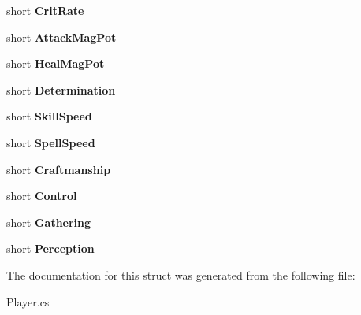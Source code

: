 \begin{DoxyCompactItemize}
\item 
\hypertarget{structffxivlib_1_1_player_1_1_p_l_a_y_e_r_i_n_f_o_ab40c6badf25d237553667c6e8cd2204b}{short {\bfseries Crit\-Rate}}\label{structffxivlib_1_1_player_1_1_p_l_a_y_e_r_i_n_f_o_ab40c6badf25d237553667c6e8cd2204b}

\item 
\hypertarget{structffxivlib_1_1_player_1_1_p_l_a_y_e_r_i_n_f_o_a82a84c20248f3b4697cdc0efbe115aaf}{short {\bfseries Attack\-Mag\-Pot}}\label{structffxivlib_1_1_player_1_1_p_l_a_y_e_r_i_n_f_o_a82a84c20248f3b4697cdc0efbe115aaf}

\item 
\hypertarget{structffxivlib_1_1_player_1_1_p_l_a_y_e_r_i_n_f_o_aa3672b08ab0dcf943814b39adc3684de}{short {\bfseries Heal\-Mag\-Pot}}\label{structffxivlib_1_1_player_1_1_p_l_a_y_e_r_i_n_f_o_aa3672b08ab0dcf943814b39adc3684de}

\item 
\hypertarget{structffxivlib_1_1_player_1_1_p_l_a_y_e_r_i_n_f_o_a808248c6e0a41b393bdc2aae1874ea8e}{short {\bfseries Determination}}\label{structffxivlib_1_1_player_1_1_p_l_a_y_e_r_i_n_f_o_a808248c6e0a41b393bdc2aae1874ea8e}

\item 
\hypertarget{structffxivlib_1_1_player_1_1_p_l_a_y_e_r_i_n_f_o_ab311411afe59aa5562b5f122fe97ca78}{short {\bfseries Skill\-Speed}}\label{structffxivlib_1_1_player_1_1_p_l_a_y_e_r_i_n_f_o_ab311411afe59aa5562b5f122fe97ca78}

\item 
\hypertarget{structffxivlib_1_1_player_1_1_p_l_a_y_e_r_i_n_f_o_acfca12f84244ffa407a78af2914b63fc}{short {\bfseries Spell\-Speed}}\label{structffxivlib_1_1_player_1_1_p_l_a_y_e_r_i_n_f_o_acfca12f84244ffa407a78af2914b63fc}

\item 
\hypertarget{structffxivlib_1_1_player_1_1_p_l_a_y_e_r_i_n_f_o_a132cc5dcd38950cf69ba96092c9ff817}{short {\bfseries Craftmanship}}\label{structffxivlib_1_1_player_1_1_p_l_a_y_e_r_i_n_f_o_a132cc5dcd38950cf69ba96092c9ff817}

\item 
\hypertarget{structffxivlib_1_1_player_1_1_p_l_a_y_e_r_i_n_f_o_adda7db7f5b2a2b74875cb56243d16cf2}{short {\bfseries Control}}\label{structffxivlib_1_1_player_1_1_p_l_a_y_e_r_i_n_f_o_adda7db7f5b2a2b74875cb56243d16cf2}

\item 
\hypertarget{structffxivlib_1_1_player_1_1_p_l_a_y_e_r_i_n_f_o_a06313cc141a14de1f3bfc07470192a3a}{short {\bfseries Gathering}}\label{structffxivlib_1_1_player_1_1_p_l_a_y_e_r_i_n_f_o_a06313cc141a14de1f3bfc07470192a3a}

\item 
\hypertarget{structffxivlib_1_1_player_1_1_p_l_a_y_e_r_i_n_f_o_afaa389295165211145f21e766cf35ed7}{short {\bfseries Perception}}\label{structffxivlib_1_1_player_1_1_p_l_a_y_e_r_i_n_f_o_afaa389295165211145f21e766cf35ed7}

\end{DoxyCompactItemize}


The documentation for this struct was generated from the following file\-:\begin{DoxyCompactItemize}
\item 
Player.\-cs\end{DoxyCompactItemize}
